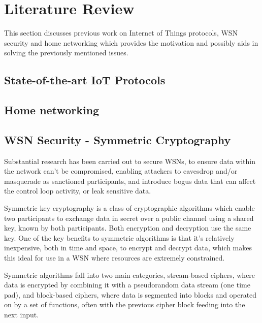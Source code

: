 \documentclass{mprop}
\begin{document}

\section{Literature Review}
This section discusses previous work on Internet of Things protocols, WSN security and home networking which provides the motivation and possibly aids in solving the previously mentioned issues.

\subsection{State-of-the-art IoT Protocols} %
\label{sub:state_of_the_art_iot_protocols}


\subsection{Home networking} %
\label{sub:homework_smart_home_router}


\subsection{WSN Security - Symmetric Cryptography} %
\label{sub:tinysec_minisec_contikisec}
Substantial research has been carried out to secure WSNs, to ensure data within the network can't be compromised, enabling attackers to eavesdrop and/or masquerade as sanctioned participants, and introduce bogus data that can affect the control loop activity, or leak sensitive data.

Symmetric key cryptography is a class of cryptographic algorithms which enable two participants to exchange data in secret over a public channel using a shared key, known by both participants. Both encryption and decryption use the same key. One of the key benefits to symmetric algorithms is that it's relatively inexpensive, both in time and space, to encrypt and decrypt data, which makes this ideal for use in a WSN where resources are extremely constrained.

Symmetric algorithms fall into two main categories, stream-based ciphers, where data is encrypted by combining it with a pseudorandom data stream (one time pad), and block-based ciphers, where data is segmented into blocks and operated on by a set of functions, often with the previous cipher block feeding into the next input. 
\end{document}
